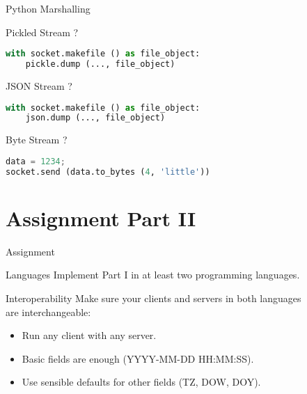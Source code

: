 \begin{frame}[fragile]{Python Marshalling}
    \begin{block}{Pickled Stream ?}
\begin{lstlisting}[language=python,style=mini]
with socket.makefile () as file_object:
    pickle.dump (..., file_object)
\end{lstlisting}
    \end{block}
    \begin{block}{JSON Stream ?}
\begin{lstlisting}[language=python,style=mini]
with socket.makefile () as file_object:
    json.dump (..., file_object)
\end{lstlisting}
    \end{block}
    \begin{block}{Byte Stream ?}
\begin{lstlisting}[language=python,style=mini]
data = 1234;
socket.send (data.to_bytes (4, 'little'))
\end{lstlisting}
    \end{block}
\end{frame}


\section{Assignment Part II}


\begin{frame}{Assignment}
    \begin{block}{Languages}
        Implement Part I in at least two programming languages.
    \end{block}

    \bigskip

    \begin{block}{Interoperability}
        Make sure your clients and servers in both languages \\ are interchangeable:
        \begin{itemize}
            \item Run any client with any server.
            \item Basic fields are enough (YYYY-MM-DD HH:MM:SS).
            \item Use sensible defaults for other fields (TZ, DOW, DOY).
        \end{itemize}
    \end{block}
\end{frame}
